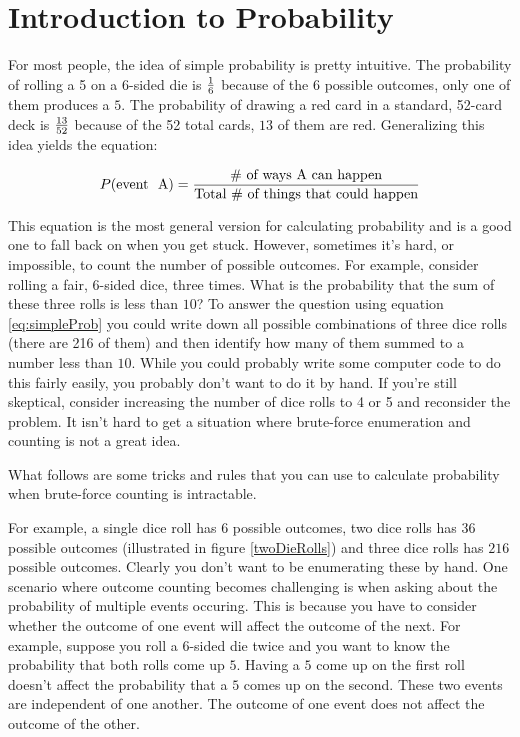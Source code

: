 \chapter{Introduction to Probability}
 \label{chap:probability} 

  For most people, the idea of simple
 probability is pretty intuitive.  The probability of rolling a 5 on a
 6-sided die is ${ 1\over 6}$ because of the $6$ possible outcomes,
 only one of them produces a $5$.  The probability of drawing a red
 card in a standard, 52-card deck is ${13\over 52}$ because of the 52
 total cards, $13$ of them are red.  Generalizing this idea yields the
 equation:

\begin{equation}\label{eq:simpleProb}
  P(\text{event~ A}) = {\text{\#~of~ways~A~can~happen}\over \text{Total~\#~of~things~that~could~happen}}
\end{equation}


This equation is the most general version for calculating probability
and is a good one to fall back on when you get stuck.  However,
sometimes it's hard, or impossible, to count the number of possible
outcomes. For example, consider rolling a fair, $6$-sided dice, three
times.  What is the probability that the sum of these three rolls is
less than $10$?  To answer the question using equation
\eqref{eq:simpleProb} you could write down all possible combinations
of three dice rolls (there are 216 of them) and then identify how many
of them summed to a number less than $10$.  While you could probably
write some computer code to do this fairly easily, you probably don't want to do
it by hand. If you're still skeptical, consider increasing the number
of dice rolls to 4 or 5 and reconsider the problem.  It isn't hard to get a
situation where brute-force enumeration and counting is not a great idea.


What follows are some tricks and rules that you can
use to calculate probability when brute-force counting is intractable.



For example, a single dice roll has $6$ possible outcomes, two dice
rolls has $36$ possible outcomes (illustrated in figure
\ref{twoDieRolls}) and three dice rolls has $216$ possible outcomes.
Clearly you don't want to be enumerating these by hand.  One scenario
where outcome counting becomes challenging is when asking about the
probability of multiple events occuring.  This is because you have to
consider whether the outcome of one event will affect the outcome of
the next.  For example, suppose you roll a $6$-sided die twice and you
want to know the probability that both rolls come up $5$.  Having a
$5$ come up on the first roll doesn't affect the probability that a
$5$ comes up on the second.  These two events are independent of one
another.  The outcome of one event does not affect the outcome of the
other.

